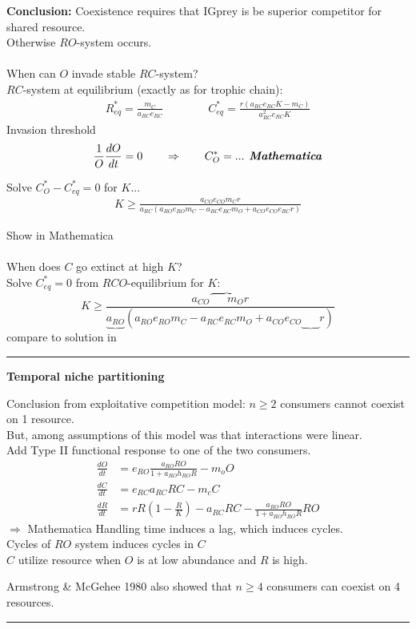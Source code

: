 \documentclass{article}
\newcommand{\note}[1]{\colorbox{gray!30}{#1}}
\newcommand{\ind}{\-\hspace{1cm}}
\newcommand*\circled[1]{\tikz[baseline=(char.base)]{
            \node[shape=circle,draw,inner sep=2pt] (char) {#1};}}
\begin{document}
\textbf{Conclusion:}  Coexistence requires that IGprey is be superior competitor for shared resource.\\
\ind Otherwise $RO$-system occurs.\\

\circled{5}\\
When can $O$ invade stable $RC$-system?\\
\ind $RC$-system at equilibrium (exactly as for trophic chain):
\begin{align*}
	R_{eq}^*=\frac{m_C}{a_{RC}e_{RC}} \qquad \qquad 	C_{eq}^*= \frac{r(a_{RC}e_{RC}K-m_C)}{a_{RC}^2 e_{RC} K}
\end{align*}
\ind Invasion threshold\\
\begin{align*}
	\frac{1}{O}\frac{dO}{dt} = 0 \qquad \Rightarrow \qquad C_O^* = ... \textbf{\emph{  Mathematica}}
\end{align*}

\ind Solve $C_O^* - C_{eq}^* = 0 $ for $K$...\
\begin{align*}
	K \geq \frac{a_{CO}e_{CO}m_C r}{ a_{RC}(a_{RO}e_{RO}m_C - a_{RC}e_{RC}m_O + a_{CO}e_{CO}e_{RC}r)}
\end{align*}

\note{Show in Mathematica}\\

\circled{6}\\
When does $C$ go extinct at high $K$?\\
\ind Solve $C_{eq}^* = 0$ from $RCO$-equilibrium for $K$:\\
\begin{equation*}
	K \geq \frac{a_{CO}\overbrace{\phantom{e_{CO}}m_O} r}{ \underbrace{a_{RO}}(a_{RO}e_{RO}m_C - a_{RC}e_{RC}m_O + a_{CO}e_{CO}\underbrace{\phantom{e_{RC}}}r )}
\end{equation*}
\ind \ind \ind \ind \ind \ind \note{compare to solution in \circled{5}}


\rule[0.5ex]{\linewidth}{1pt}
\begin{center}	\textbf{Temporal niche partitioning} \end{center}
Conclusion from exploitative competition model: $n\geq 2$ consumers cannot coexist on 1 resource.\\
But, among assumptions of this model was that interactions were linear.\\

Add Type II functional response to one of the two consumers.
\begin{align*}
	\frac{dO}{dt}&=e_{RO}\frac{a_{RO}R O}{1+a_{RO}h_{RO}R} - m_o O\\
	\frac{dC}{dt}&=e_{RC}a_{RC}RC - m_c C\\
	\frac{dR}{dt}&=r R \left(1-\frac{R}{K}\right) - a_{RC}RC - \frac{a_{RO}R O}{1+a_{RO}h_{RO}R}RO
\end{align*}
\note{$\Rightarrow$ Mathematica}
Handling time induces a lag, which induces cycles.\\
Cycles of $RO$ system induces cycles in $C$\\
\ind $C$ utilize resource when $O$ is at low abundance and $R$ is high. 

Armstrong \& McGehee 1980 also showed that $n \geq 4$ consumers can coexist on 4 resources.

\rule[0.5ex]{\linewidth}{1pt}
\end{document}

